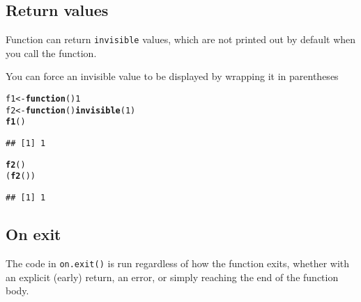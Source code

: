 \documentclass{article}\usepackage[]{graphicx}\usepackage[]{color}
\makeatletter
\newcommand{\hlnum}[1]{\textcolor[rgb]{0.686,0.059,0.569}{#1}}%
\newcommand{\hlstd}[1]{\textcolor[rgb]{0.345,0.345,0.345}{#1}}%
\newcommand{\hlkwa}[1]{\textcolor[rgb]{0.161,0.373,0.58}{\textbf{#1}}}%
\newcommand{\hlkwb}[1]{\textcolor[rgb]{0.69,0.353,0.396}{#1}}%
\newcommand{\hlkwd}[1]{\textcolor[rgb]{0.737,0.353,0.396}{\textbf{#1}}}%
\newenvironment{kframe}{%
 \def\at@end@of@kframe{}%
 \ifinner\ifhmode%
  \def\at@end@of@kframe{\end{minipage}}%
  \begin{minipage}{\columnwidth}%
 \fi\fi%
 \def\FrameCommand##1{\hskip\@totalleftmargin \hskip-\fboxsep
 \colorbox{shadecolor}{##1}\hskip-\fboxsep
     \hskip-\linewidth \hskip-\@totalleftmargin \hskip\columnwidth}%
 \MakeFramed {\advance\hsize-\width
   \@totalleftmargin\z@ \linewidth\hsize
   \@setminipage}}%
 {\par\unskip\endMakeFramed%
 \at@end@of@kframe}
\newenvironment{knitrout}{}{} %
\makeatother
\begin{document}
\subsection{Return values}

Function can return \verb`invisible` values, which are not printed out by default when you call the function.

You can force an invisible value to be displayed by wrapping it in parentheses

\begin{knitrout}
\color{fgcolor}\begin{kframe}
\begin{alltt}
\hlstd{f1} \hlkwb{<-} \hlkwa{function}\hlstd{()} \hlnum{1}
\hlstd{f2} \hlkwb{<-} \hlkwa{function}\hlstd{()} \hlkwd{invisible}\hlstd{(}\hlnum{1}\hlstd{)}
\hlkwd{f1}\hlstd{()}
\end{alltt}
\begin{verbatim}
## [1] 1
\end{verbatim}
\begin{alltt}
\hlkwd{f2}\hlstd{()}
\hlstd{(}\hlkwd{f2}\hlstd{())}
\end{alltt}
\begin{verbatim}
## [1] 1
\end{verbatim}
\end{kframe}
\end{knitrout}

\subsection{On exit}

The code in \verb`on.exit()` is run regardless of how the function exits, whether with an explicit (early) return, an error, or simply reaching the end of the function body.
\end{document}
